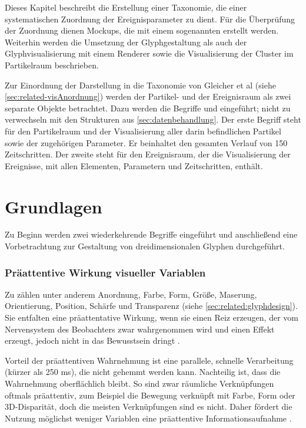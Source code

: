 Dieses Kapitel beschreibt die Erstellung einer Taxonomie, die einer systematischen Zuordnung der Ereignisparameter zu  dient. Für die Überprüfung der Zuordnung dienen Mockups, die mit einem sogenannten  erstellt werden. Weiterhin werden die Umsetzung der Glyphgestaltung als auch der Glyphvisualisierung mit einem Renderer sowie die Visualisierung der Cluster im Partikelraum beschrieben.

Zur Einordnung der Darstellung in die Taxonomie von Gleicher et al (siehe \autoref{sec:related-visAnordnung}) werden der Partikel- und der Ereignisraum als zwei separate Objekte betrachtet. Dazu werden die Begriffe  und  eingeführt; nicht zu verwechseln mit den Strukturen aus \autoref{sec:datenbehandlung}. Der erste Begriff steht für den Partikelraum und der Visualisierung aller darin befindlichen Partikel sowie der zugehörigen Parameter. Er beinhaltet den gesamten Verlauf von 150 Zeitschritten. Der zweite steht für den Ereignisraum, der die Visualisierung der Ereignisse, mit allen Elementen, Parametern und Zeitschritten, enthält.  %


\section{Grundlagen}

Zu Beginn werden zwei wiederkehrende Begriffe eingeführt und anschließend eine Vorbetrachtung zur Gestaltung von dreidimensionalen Glyphen durchgeführt.

\subsubsection*{Präattentive Wirkung visueller Variablen}\label{sec:related-praattentiveWirkung}
Zu  zählen unter anderem Anordnung, Farbe, Form, Größe, Maserung, Orientierung, Position, Schärfe und Transparenz (siehe \autoref{sec:related:glyphdesign}). Sie entfalten eine präattentative Wirkung, wenn sie einen Reiz erzeugen, der vom Nervensystem des Beobachters zwar wahrgenommen wird und einen Effekt erzeugt, jedoch nicht in das Bewusstsein dringt \cite{funke2006kognition}.

Vorteil der präattentiven Wahrnehmung ist eine parallele, schnelle Verarbeitung (kürzer als 250 \gls{ms}), die nicht gehemmt werden kann. Nachteilig ist, dass die Wahrnehmung oberflächlich bleibt. So sind zwar räumliche Verknüpfungen oftmals präattentiv, zum Beispiel die Bewegung verknüpft mit Farbe, Form oder 3D-Disparität, doch die meisten Verknüpfungen sind es nicht. Daher fördert die Nutzung möglichst weniger Variablen eine präattentive Informationsaufnahme \cite{healey2012attention}.

